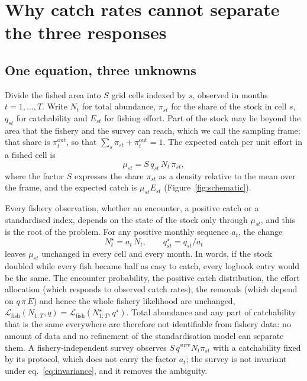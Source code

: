\documentclass[11pt,a4paper]{article}
\newcommand{\vt}[1]{\text{#1}}
\begin{document}
\section{Why catch rates cannot separate the three responses}

\subsection{One equation, three unknowns}
\label{sec:invariance}

Divide the fished area into $S$ grid cells indexed by $s$, observed in months $t=1,\dots,T$. Write $N_t$ for total abundance, $\pi_{st}$ for the share of the stock in cell $s$, $q_{st}$ for catchability and $E_{st}$ for fishing effort. Part of the stock may lie beyond the area that the fishery and the survey can reach, which we call the sampling frame; that share is $\pi^{\vt{out}}_t$, so that $\sum_s \pi_{st} + \pi^{\vt{out}}_t = 1$. The expected catch per unit effort in a fished cell is
\begin{equation}
\mu_{st} = S\,q_{st}\,N_t\,\pi_{st},
\label{eq:mu}
\end{equation}
where the factor $S$ expresses the share $\pi_{st}$ as a density relative to the mean over the frame, and the expected catch is $\mu_{st}E_{st}$ (Figure~\ref{fig:schematic}).

Every fishery observation, whether an encounter, a positive catch or a standardised index, depends on the state of the stock only through $\mu_{st}$, and this is the root of the problem. For any positive monthly sequence $a_t$, the change
\begin{equation}
N_t^{\star} = a_t\,N_t, \qquad q_{st}^{\star} = q_{st}/a_t
\label{eq:invariance}
\end{equation}
leaves $\mu_{st}$ unchanged in every cell and every month. In words, if the stock doubled while every fish became half as easy to catch, every logbook entry would be the same. The encounter probability, the positive catch distribution, the effort allocation (which responds to observed catch rates), the removals (which depend on $q\,\pi\,E$) and hence the whole fishery likelihood are unchanged, $\mathcal{L}_{\vt{fish}}(N_{1:T}, q) = \mathcal{L}_{\vt{fish}}(N^{\star}_{1:T}, q^{\star})$. Total abundance and any part of catchability that is the same everywhere are therefore not identifiable from fishery data: no amount of data and no refinement of the standardisation model can separate them. A fishery-independent survey observes $S\,q^{\vt{surv}}N_t\pi_{st}$ with a catchability fixed by its protocol, which does not carry the factor $a_t$; the survey is not invariant under eq.~\eqref{eq:invariance}, and it removes the ambiguity.
\end{document}
